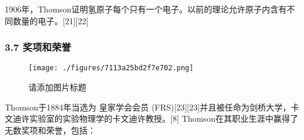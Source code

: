 1906年，Thomson证明氢原子每个只有一个电子。以前的理论允许原子内含有不同数量的电子。[21][22]

\subsubsection{3.7 奖项和荣誉}
\begin{figure}[ht]
\centering
\texttt{[image: ./figures/7113a25bd2f7e702.png]}
\caption{请添加图片标题} \label{fig_Joseph_7}
\end{figure}

Thomson于1884年当选为 皇家学会会员 (FRS)[23][23]并且被任命为剑桥大学，卡文迪许实验室的实验物理学的卡文迪许教授。[8] Thomson在其职业生涯中赢得了无数奖项和荣誉，包括：